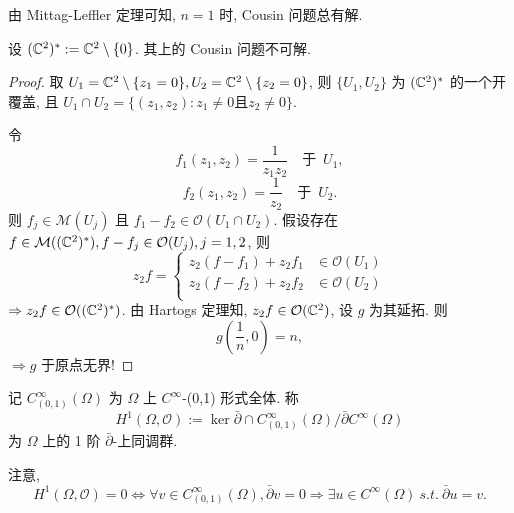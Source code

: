 由 Mittag-Leffler 定理可知, $n=1$ 时, Cousin 问题总有解. 

\begin{example}
  设 $({\mathbb C}^2)^{*}:={\mathbb C}^2 \setminus \{0\}$. 其上的 Cousin 问题不可解. 
\end{example}
\begin{proof}
  取 $U_1={\mathbb C}^2 \setminus \{z_1=0\}, U_2={\mathbb C}^2 \setminus \{z_2=0\}$, 则 
  $\{U_1,U_2\}$ 为 $({\mathbb C}^2)^{*}$  的一个开覆盖, 且 $U_1 \cap U_2= \{(z_1,z_2): z_1 \neq 0 \text{且} z_2 \neq 0\}$.  

  令 
  $$ f_1(z_1,z_2)=\frac{1}{z_1z_2} \quad \text{于 }\, U_1,  $$
  $$ f_2(z_1,z_2)=\frac{1}{z_2} \quad \text{于 }\, U_2.  $$
  则 $f_j \in \mathcal{M}(U_j)$ 且 $f_1-f_2 \in \mathcal{O}(U_1 \cap U_2)$.  
  假设存在 $f \in \mathcal{M}(({\mathbb C}^2)^{*}),f-f_j \in \mathcal{O}(U_j), j=1,2$, 则 
  $$ z_2 f= \begin{cases}
   z_2(f-f_1)+z_2 f_1  &\text{} \in \mathcal{O}(U_1)\\
    z_2(f-f_2)+z_2 f_2  &\text{} \in \mathcal{O}(U_2)\\
  \end{cases}  $$ 
  $\Rightarrow z_2 f \in \mathcal{O}(({\mathbb C}^2)^{*})$. 由 Hartogs 定理知, $z_2 f \in \mathcal{O}({\mathbb C}^2)$, 设 $g$ 为其延拓. 则 
  $$ g(\frac{1}{n},0)=n ,$$   
  $\Rightarrow g$ 于原点无界! 
\end{proof}


\begin{definition}
  记 $C_{(0,1)}^{\infty }(\Omega )$ 为 $\Omega $ 上 $C^{\infty }$-(0,1) 形式全体. 称 
  $$ H^1(\Omega ,\mathcal{O}):=\ker \bar{\partial } \cap  C_{(0,1)}^{\infty }(\Omega ) / \bar{\partial } C^{\infty }(\Omega )$$   
  为 $\Omega $ 上的 1 阶 $\bar{\partial }$-上同调群.  
\end{definition}
注意,
  $$ H^1(\Omega ,\mathcal{O})=0 \Leftrightarrow \forall v \in C_{(0,1)}^{\infty }(\Omega ), \bar{\partial }v=0  \Rightarrow \exists u \in C^{\infty }(\Omega ) ~ s.t. ~ \bar{\partial }u=v.$$


